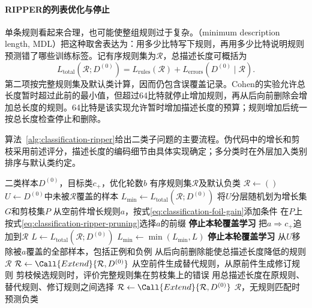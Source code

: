 \paragraph{RIPPER的列表优化与停止}
单条规则看起来合理，也可能使整组规则过于复杂。（minimum description length, MDL）把这种取舍表达为：用多少比特写下规则，再用多少比特说明规则预测错了哪些训练标签。记有序规则集为$\mathcal{R}$，总描述长度可概括为
\begin{equation}
  L_{\mathrm{total}}(\mathcal{R};D^{(0)})
  =L_{\mathrm{rules}}(\mathcal{R})
   +L_{\mathrm{errors}}(D^{(0)}\mid\mathcal{R}).
  \label{eq:classification-rule-description-length}
\end{equation}
第二项按完整规则集及默认类计算，因而仍包含误覆盖记录。Cohen的实验允许总长度暂时超过此前的最小值，但超过64比特就停止增加规则，再从后向前删除会增加总长度的规则。64比特是该实现允许暂时增加描述长度的预算；规则增加后统一按总长度检查停止和删除。

算法~\ref{alg:classification-ripper}给出二类子问题的主要流程。伪代码中的增长和剪枝采用前述评分，描述长度的编码细节由具体实现确定；多分类时在外层加入类别排序与默认类约定。

\begin{algorithm}[RIPPER的覆盖学习与规则优化]
  \label{alg:classification-ripper}
  \begin{algorithmic}[1]
    \Require 二类样本$D^{(0)}$，目标类$c_+$，优化轮数$b$
    \Ensure 有序规则集$\mathcal{R}$及默认负类
    \State $\mathcal{R}\gets()$
      \State $U\gets D^{(0)}$中未被$\mathcal{R}$覆盖的样本
      \State $L_{\min}\gets L_{\mathrm{total}}(\mathcal{R};D^{(0)})$
        \State 将$U$分层随机划为增长集$G$和剪枝集$P$
        \State 从空前件增长规则$a$，按式\eqref{eq:classification-foil-gain}添加条件
        \State 在$P$上按式\eqref{eq:classification-ripper-pruning}选择$a$的前缀
          \State \textbf{停止本轮覆盖学习}
        \EndIf
        \State 把$a\Longrightarrow c_+$追加到$\mathcal{R}$
        \State $L\gets L_{\mathrm{total}}(\mathcal{R};D^{(0)})$
        \State $L_{\min}\gets\min(L_{\min},L)$
          \State \textbf{停止本轮覆盖学习}
        \EndIf
        \State 从$U$移除被$a$覆盖的全部样本，包括正例和负例
      \EndWhile
      \State 从后向前删除能使总描述长度降低的规则
      \State \Return $\mathcal{R}$
    \EndFunction
    \State $\mathcal{R}\gets\Call{Extend}{\mathcal{R},D^{(0)}}$
        \State 从空前件生成替代规则，从原前件生成修订规则
        \State 剪枝候选规则时，评价完整规则集在剪枝集上的错误
        \State 用总描述长度在原规则、替代规则、修订规则之间选择
      \EndFor
      \State $\mathcal{R}\gets\Call{Extend}{\mathcal{R},D^{(0)}}$
    \EndFor
    \State \Return $\mathcal{R}$，无规则匹配时预测负类
  \end{algorithmic}
\end{algorithm}

